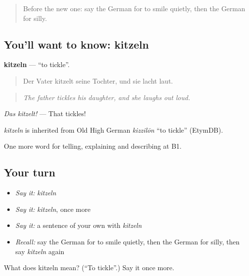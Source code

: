 \label{lesson:GE-C473-kitzeln}



\begin{quote}
Before the new one: say the German for to smile quietly, then the German for silly.
\end{quote}

\subsection*{You'll want to know: kitzeln}
\textbf{kitzeln} — \textquotedblleft{}to tickle\textquotedblright{}.

\begin{quote}
Der Vater kitzelt seine Tochter, und sie lacht laut.
\end{quote}

\begin{quote}
\emph{The father tickles his daughter, and she laughs out loud.}
\end{quote}

\emph{Das kitzelt!} — That tickles!

\begin{cousinweb}
\emph{kitzeln} is inherited from Old High German \emph{kizzilōn} \textquotedblleft{}to tickle\textquotedblright{} (EtymDB).
\end{cousinweb}

\begin{grammarlens}[title={What you've built}]
One more word for telling, explaining and describing at B1.
\end{grammarlens}

\subsection*{Your turn}
\begin{itemize}
\raggedright
  \item \emph{Say it:} \emph{kitzeln}
  \item \emph{Say it:} \emph{kitzeln}, once more
  \item \emph{Say it:} a sentence of your own with \emph{kitzeln}
  \item \emph{Recall:} say the German for to smile quietly, then the German for silly, then say \emph{kitzeln} again
\end{itemize}

\begin{tcolorbox}[breakable,colback=teal!4,colframe=teal!35!black,title={Before you move on}]
What does kitzeln mean? (\textquotedblleft{}To tickle\textquotedblright{}.) Say it once more.
\end{tcolorbox}
